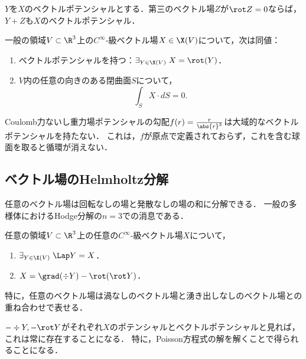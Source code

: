 \documentclass[uplatex,dvipdfmx]{jsreport}
\begin{document}
\begin{proposition}[ベクトルポテンシャルの不定性]
    $Y$を$X$のベクトルポテンシャルとする．第三のベクトル場$Z$が$\rot Z=0$ならば，$Y+Z$も$X$のベクトルポテンシャル．
\end{proposition}

\begin{theorem}
    一般の領域$V\subset\R^3$上の$C^\infty$-級ベクトル場$X\in\X(V)$について，次は同値：
    \begin{enumerate}
        \item ベクトルポテンシャルを持つ：$\exists_{Y\in\X(V)}\;X=\rot(Y)$．
        \item $V$内の任意の向きのある閉曲面$S$について，
        \[\int_SX\cdot dS=0.\]
    \end{enumerate}
\end{theorem}

\begin{example}
    Coulomb力ないし重力場ポテンシャルの勾配$f(r)=\frac{r}{\abs{r}^3}$は大域的なベクトルポテンシャルを持たない．
    これは，$f$が原点で定義されておらず，これを含む球面を取ると循環が消えない．
\end{example}

\subsection{ベクトル場のHelmholtz分解}

\begin{tcolorbox}[colframe=ForestGreen, colback=ForestGreen!10!white,breakable,colbacktitle=ForestGreen!40!white,coltitle=black,fonttitle=\bfseries\sffamily,
title=]
    任意のベクトル場は回転なしの場と発散なしの場の和に分解できる．
    一般の多様体におけるHodge分解の$n=3$での消息である．
\end{tcolorbox}

\begin{theorem}[Helmholtz]
    任意の領域$V\subset\R^3$上の任意の$C^\infty$-級ベクトル場$X$について，
    \begin{enumerate}
        \item $\exists_{Y\in \X(V)}\;\Lap Y=X$．
        \item $X=\grad(\div Y)-\rot(\rot Y)$．
    \end{enumerate}
    特に，任意のベクトル場は渦なしのベクトル場と湧き出しなしのベクトル場との重ね合わせで表せる．
\end{theorem}
\begin{remarks}
    $-\div Y,-\rot Y$がそれぞれ$X$のポテンシャルとベクトルポテンシャルと見れば，これは常に存在することになる．
    特に，Poisson方程式の解を解くことで得られることになる．
\end{remarks}
\end{document}
